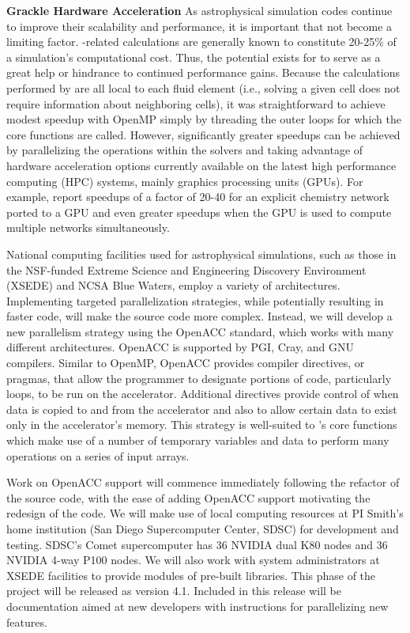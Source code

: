 \noindent \textbf{Grackle Hardware Acceleration}
As astrophysical simulation codes continue to improve their
scalability and performance, it is important that \grackle{} not
become a limiting factor.  \grackle{}-related calculations are
generally known to constitute 20-25\% of a simulation's computational
cost.  Thus, the potential exists for \grackle{} to serve as a great
help or hindrance to continued performance gains.  Because the
calculations performed by \grackle{} are all local to each fluid
element (i.e., solving a given cell does not require information about
neighboring cells), it was straightforward to achieve modest speedup
with OpenMP simply by threading the outer loops for which the core
functions are called.  However, significantly greater speedups can be
achieved by parallelizing the operations within the solvers and taking
advantage of hardware acceleration options currently available on the
latest high performance computing (HPC) systems, mainly graphics
processing units (GPUs). For example, \citet{Haidar2016PerformanceAA}
report speedups of a factor of 20-40 for an explicit chemistry network
ported to a GPU and even greater speedups when the GPU is used to
compute multiple networks simultaneously.

National computing facilities used for astrophysical simulations, such
as those in the NSF-funded Extreme Science and Engineering Discovery
Environment (XSEDE) and NCSA Blue Waters, employ a variety of
architectures.  Implementing targeted parallelization strategies,
while potentially resulting in faster code, will make the source code
more complex. Instead, we will develop a new parallelism strategy
using the OpenACC standard, which works with many different
architectures.  OpenACC is supported 
by PGI, Cray, and GNU compilers.  Similar to OpenMP, OpenACC provides
compiler directives, or pragmas, that allow the programmer to
designate portions of code, particularly loops, to be run on the
accelerator.  Additional directives provide control of when data is
copied to and from the accelerator and also to allow certain data to
exist only in the accelerator's memory.  This strategy is well-suited
to \grackle{}'s core functions which make use of a number of temporary
variables and data to perform many operations on a series of input
arrays.

Work on OpenACC support will commence immediately following the
refactor of the \grackle{} source code, with the ease of adding
OpenACC support motivating the redesign of the code.  We will
make use of local computing resources at PI Smith's home institution
(San Diego Supercomputer Center, SDSC) for development and testing.
SDSC's Comet supercomputer has 36 NVIDIA dual K80 nodes and 36 NVIDIA
4-way P100 nodes. We will also work with system administrators at
XSEDE facilities to provide modules of pre-built \grackle{}
libraries. This phase of the project will be released as \grackle{}
version 4.1. Included in this release will be documentation aimed at
new developers with instructions for parallelizing new features.


